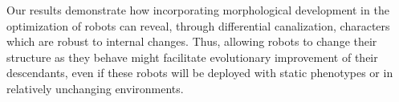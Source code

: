 Our results demonstrate how incorporating morphological development in the optimization of robots can reveal, through differential canalization, characters which are robust to internal changes.
Thus, allowing robots to change their structure as they behave might facilitate evolutionary improvement of their descendants, even if these robots will be deployed with static phenotypes or in relatively unchanging environments.





